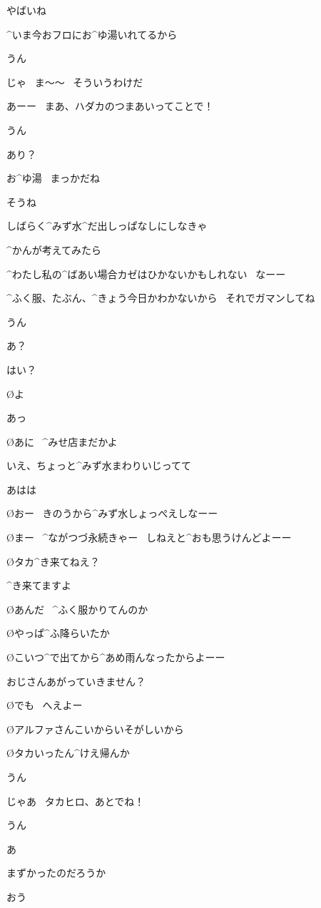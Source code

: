 \T やばいね

\A ^{いま}{今}おフロにお^{ゆ}{湯}いれてるから

\T うん

\A じゃ
\ ま〜〜
\ そういうわけだ

\page
\A あーー
\ まあ、ハダカのつまあいってことで！

\T うん

\A あり？

\page
\T お^{ゆ}{湯}
\ まっかだね

\A そうね

\A しばらく^{みず}{水}^{だ}{出}しっぱなしにしなきゃ

\A ^{かんが}{考}えてみたら

\A ^{わたし}{私}の^{ばあい}{場合}カゼはひかないかもしれない
\ なーー

\page
\A ^{ふく}{服}、たぶん、^{きょう}{今日}かわかないから
\ それでガマンしてね

\T うん

\A あ？

\page
\A はい？

\O よ

\A あっ

\O あに
\ ^{みせ}{店}まだかよ

\A いえ、ちょっと^{みず}{水}まわりいじってて

\A あはは

\O おー
\ きのうから^{みず}{水}しょっぺえしなーー

\O まー
\ ^{ながつづ}{永続}きゃー
\ しねえと^{おも}{思}うけんどよーー

\O タカ^{き}{来}てねえ？

\page
\A ^{き}{来}てますよ

\O あんだ
\ ^{ふく}{服}かりてんのか

\O やっぱ^{ふ}{降}らいたか

\O こいつ^{で}{出}てから^{あめ}{雨}んなったからよーー

\A おじさんあがっていきません？

\O でも
\ へえよー

\O アルファさんこいからいそがしいから

\O タカいったん^{けえ}{帰}んか

\T うん

\page
\A じゃあ
\ タカヒロ、あとでね！

\T うん

\A あ

\A まずかったのだろうか

\page
\T おう

